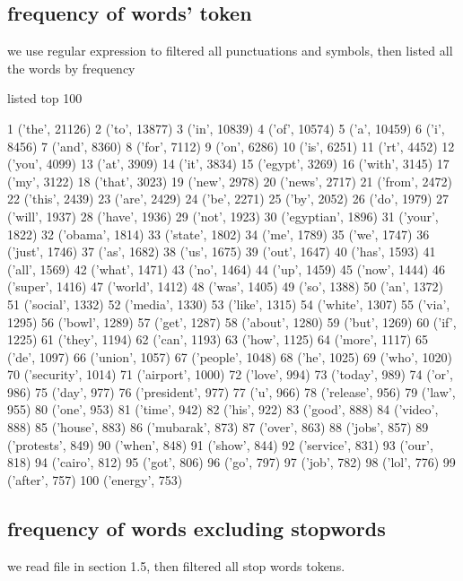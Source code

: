 \documentclass{article}
\begin{document}
\subsection{frequency of words' token}

we use regular expression to filtered all punctuations and symbols, then listed all the words by frequency \newline

listed top 100

\begin{spverbatim}
1 ('the', 21126)
2 ('to', 13877)
3 ('in', 10839)
4 ('of', 10574)
5 ('a', 10459)
6 ('i', 8456)
7 ('and', 8360)
8 ('for', 7112)
9 ('on', 6286)
10 ('is', 6251)
11 ('rt', 4452)
12 ('you', 4099)
13 ('at', 3909)
14 ('it', 3834)
15 ('egypt', 3269)
16 ('with', 3145)
17 ('my', 3122)
18 ('that', 3023)
19 ('new', 2978)
20 ('news', 2717)
21 ('from', 2472)
22 ('this', 2439)
23 ('are', 2429)
24 ('be', 2271)
25 ('by', 2052)
26 ('do', 1979)
27 ('will', 1937)
28 ('have', 1936)
29 ('not', 1923)
30 ('egyptian', 1896)
31 ('your', 1822)
32 ('obama', 1814)
33 ('state', 1802)
34 ('me', 1789)
35 ('we', 1747)
36 ('just', 1746)
37 ('as', 1682)
38 ('us', 1675)
39 ('out', 1647)
40 ('has', 1593)
41 ('all', 1569)
42 ('what', 1471)
43 ('no', 1464)
44 ('up', 1459)
45 ('now', 1444)
46 ('super', 1416)
47 ('world', 1412)
48 ('was', 1405)
49 ('so', 1388)
50 ('an', 1372)
51 ('social', 1332)
52 ('media', 1330)
53 ('like', 1315)
54 ('white', 1307)
55 ('via', 1295)
56 ('bowl', 1289)
57 ('get', 1287)
58 ('about', 1280)
59 ('but', 1269)
60 ('if', 1225)
61 ('they', 1194)
62 ('can', 1193)
63 ('how', 1125)
64 ('more', 1117)
65 ('de', 1097)
66 ('union', 1057)
67 ('people', 1048)
68 ('he', 1025)
69 ('who', 1020)
70 ('security', 1014)
71 ('airport', 1000)
72 ('love', 994)
73 ('today', 989)
74 ('or', 986)
75 ('day', 977)
76 ('president', 977)
77 ('u', 966)
78 ('release', 956)
79 ('law', 955)
80 ('one', 953)
81 ('time', 942)
82 ('his', 922)
83 ('good', 888)
84 ('video', 888)
85 ('house', 883)
86 ('mubarak', 873)
87 ('over', 863)
88 ('jobs', 857)
89 ('protests', 849)
90 ('when', 848)
91 ('show', 844)
92 ('service', 831)
93 ('our', 818)
94 ('cairo', 812)
95 ('got', 806)
96 ('go', 797)
97 ('job', 782)
98 ('lol', 776)
99 ('after', 757)
100 ('energy', 753)	
\end{spverbatim}

\subsection{frequency of words excluding stopwords}
we read file in section 1.5, then filtered all stop words tokens. \newline
\end{document}
